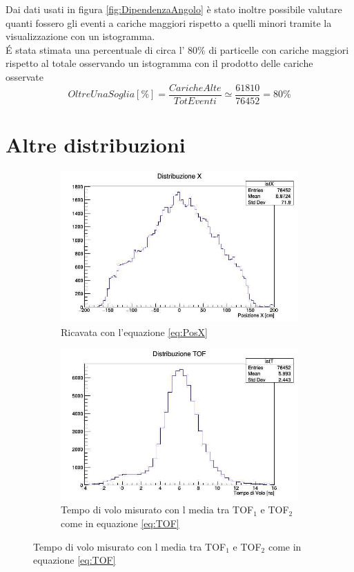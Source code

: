 \documentclass[a4paper]{article}
\begin{document}
Dai dati usati in figura \ref{fig:DipendenzaAngolo} è stato inoltre possibile valutare quanti fossero gli eventi a cariche maggiori rispetto a quelli minori tramite la visualizzazione con un istogramma.\\
\'E stata stimata una percentuale di circa l' 80$\%$ di particelle con cariche maggiori rispetto al totale osservando un istogramma con il prodotto delle cariche osservate
\begin{equation}
OltreUnaSoglia [\%] = \frac{Cariche Alte}{Tot Eventi} \simeq \frac{61810}{76452} = 80 \% 
\end{equation}

\section{Altre distribuzioni}
\begin{figure}[H]
\begin{subfigure}[b]{0.4\textwidth}
\includegraphics[width=\textwidth]{./immagini/TimeOfFlight/DistrX.jpg}
\caption{Ricavata con l'equazione \ref{eq:PosX}}
\label{fig:DistrX}
\end{subfigure}
\hfill
\begin{subfigure}[b]{0.4\textwidth}
\includegraphics[width=\textwidth]{./immagini/TimeOfFlight/DistrTOF.jpg}
\caption{Tempo di volo misurato con l media tra TOF$_1$ e TOF$_2$ come in equazione \ref{eq:TOF}}
\label{fig:DistrTof}
\end{subfigure}
\end{figure}
\end{document}
